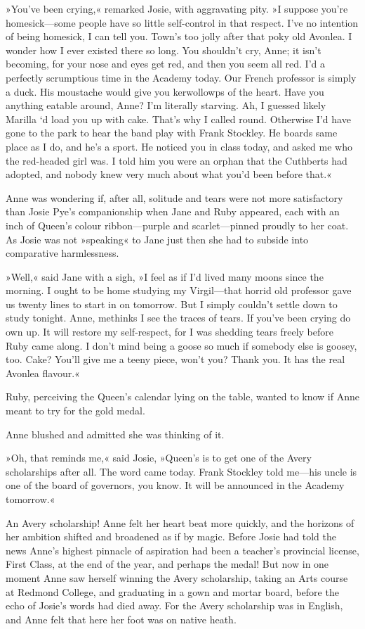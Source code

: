 »You've been crying,« remarked Josie, with aggravating pity. »I suppose you're homesick—some people have so little self-control in that respect. I've no intention of being homesick, I can tell you. Town's too jolly after that poky old Avonlea. I wonder how I ever existed there so long. You shouldn't cry, Anne; it isn't becoming, for your nose and eyes get red, and then you seem all red. I'd a perfectly scrumptious time in the Academy today. Our French professor is simply a duck. His moustache would give you kerwollowps of the heart. Have you anything eatable around, Anne? I'm literally starving. Ah, I guessed likely Marilla `d load you up with cake. That's why I called round. Otherwise I'd have gone to the park to hear the band play with Frank Stockley. He boards same place as I do, and he's a sport. He noticed you in class today, and asked me who the red-headed girl was. I told him you were an orphan that the Cuthberts had adopted, and nobody knew very much about what you'd been before that.«

Anne was wondering if, after all, solitude and tears were not more satisfactory than Josie Pye's companionship when Jane and Ruby appeared, each with an inch of Queen's colour ribbon—purple and scarlet—pinned proudly to her coat. As Josie was not »speaking« to Jane just then she had to subside into comparative harmlessness.

»Well,« said Jane with a sigh, »I feel as if I'd lived many moons since the morning. I ought to be home studying my Virgil—that horrid old professor gave us twenty lines to start in on tomorrow. But I simply couldn't settle down to study tonight. Anne, methinks I see the traces of tears. If you've been crying do own up. It will restore my self-respect, for I was shedding tears freely before Ruby came along. I don't mind being a goose so much if somebody else is goosey, too. Cake? You'll give me a teeny piece, won't you? Thank you. It has the real Avonlea flavour.«

Ruby, perceiving the Queen's calendar lying on the table, wanted to know if Anne meant to try for the gold medal.

Anne blushed and admitted she was thinking of it.

»Oh, that reminds me,« said Josie, »Queen's is to get one of the Avery scholarships after all. The word came today. Frank Stockley told me—his uncle is one of the board of governors, you know. It will be announced in the Academy tomorrow.«

An Avery scholarship! Anne felt her heart beat more quickly, and the horizons of her ambition shifted and broadened as if by magic. Before Josie had told the news Anne's highest pinnacle of aspiration had been a teacher's provincial license, First Class, at the end of the year, and perhaps the medal! But now in one moment Anne saw herself winning the Avery scholarship, taking an Arts course at Redmond College, and graduating in a gown and mortar board, before the echo of Josie's words had died away. For the Avery scholarship was in English, and Anne felt that here her foot was on native heath.

